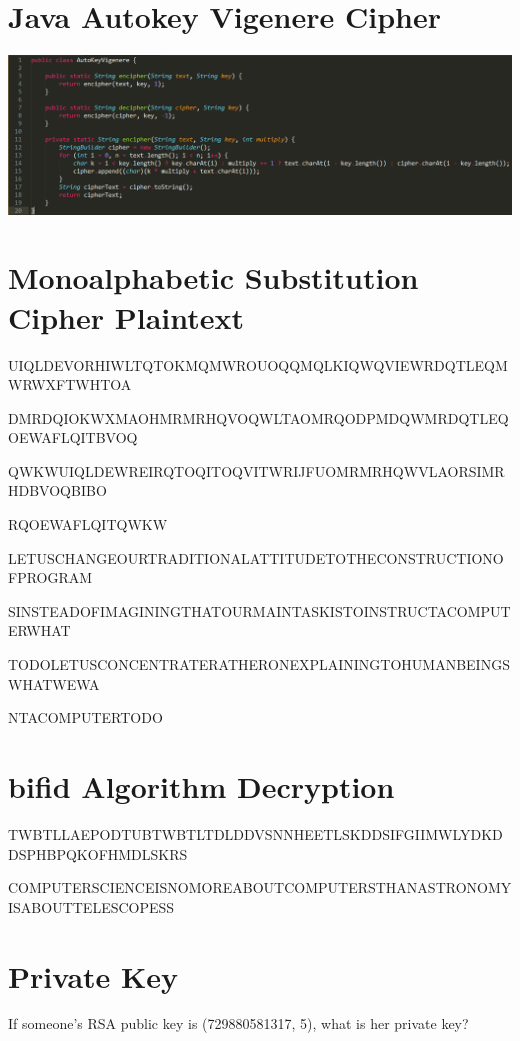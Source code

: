 \documentclass{article}
\begin{document}
\section{Java Autokey Vigenere Cipher}
\begin{center}
\includegraphics[scale=0.5]{AutoKeyVigenere.png}
\end{center}

\section{Monoalphabetic Substitution Cipher Plaintext}
UIQLDEVORHIWLTQTOKMQMWROUOQQMQLKIQWQVIEWRDQTLEQMWRWXFTWHTOA

DMRDQIOKWXMAOHMRMRHQVOQWLTAOMRQODPMDQWMRDQTLEQOEWAFLQITBVOQ

QWKWUIQLDEWREIRQTOQITOQVITWRIJFUOMRMRHQWVLAORSIMRHDBVOQBIBO

RQOEWAFLQITQWKW

\vspace{5mm}

LETUSCHANGEOURTRADITIONALATTITUDETOTHECONSTRUCTIONOFPROGRAM

SINSTEADOFIMAGININGTHATOURMAINTASKISTOINSTRUCTACOMPUTERWHAT

TODOLETUSCONCENTRATERATHERONEXPLAININGTOHUMANBEINGSWHATWEWA

NTACOMPUTERTODO

\section{bifid Algorithm Decryption}
TWBTLLAEPODTUBTWBTLTDLDDVSNNHEETLSKDDSIFGIIMWLYDKDDSPHBPQKOFHMDLSKRS

\vspace{5mm}

COMPUTERSCIENCEISNOMOREABOUTCOMPUTERSTHANASTRONOMYISABOUTTELESCOPESS

\section{Private Key}
If someone's RSA public key is (729880581317, 5), what is her private key?
\end{document}
